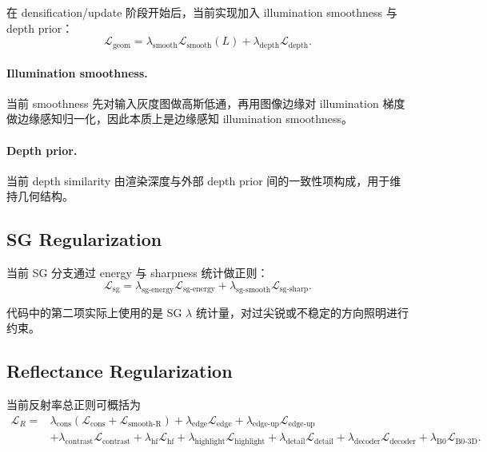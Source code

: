 \documentclass[11pt]{article}
\begin{document}
在 densification/update 阶段开始后，当前实现加入 illumination smoothness 与 depth prior：
\begin{equation}
    \mathcal{L}_{\text{geom}}
    =
    \lambda_{\text{smooth}}\mathcal{L}_{\text{smooth}}(L)
    +
    \lambda_{\text{depth}}\mathcal{L}_{\text{depth}}.
\end{equation}

\paragraph{Illumination smoothness.}
当前 smoothness 先对输入灰度图做高斯低通，再用图像边缘对 illumination 梯度做边缘感知归一化，因此本质上是边缘感知 illumination smoothness。

\paragraph{Depth prior.}
当前 depth similarity 由渲染深度与外部 depth prior 间的一致性项构成，用于维持几何结构。

\subsection{SG Regularization}

当前 SG 分支通过 energy 与 sharpness 统计做正则：
\begin{equation}
    \mathcal{L}_{\text{sg}}
    =
    \lambda_{\text{sg-energy}}\mathcal{L}_{\text{sg-energy}}
    +
    \lambda_{\text{sg-smooth}}\mathcal{L}_{\text{sg-sharp}}.
\end{equation}

代码中的第二项实际上使用的是 SG $\lambda$ 统计量，对过尖锐或不稳定的方向照明进行约束。

\subsection{Reflectance Regularization}

当前反射率总正则可概括为
\begin{align}
    \mathcal{L}_{R}
    ={}&
    \lambda_{\text{cons}}
    \left(
        \mathcal{L}_{\text{cons}}
        +
        \mathcal{L}_{\text{smooth-R}}
    \right)
    +
    \lambda_{\text{edge}}\mathcal{L}_{\text{edge}}
    +
    \lambda_{\text{edge-up}}\mathcal{L}_{\text{edge-up}}
    \nonumber \\
    &+
    \lambda_{\text{contrast}}\mathcal{L}_{\text{contrast}}
    +
    \lambda_{\text{hf}}\mathcal{L}_{\text{hf}}
    +
    \lambda_{\text{highlight}}\mathcal{L}_{\text{highlight}}
    +
    \lambda_{\text{detail}}\mathcal{L}_{\text{detail}}
    +
    \lambda_{\text{decoder}}\mathcal{L}_{\text{decoder}}
    +
    \lambda_{\text{B0}}\mathcal{L}_{\text{B0-3D}}.
\end{align}
\end{document}
